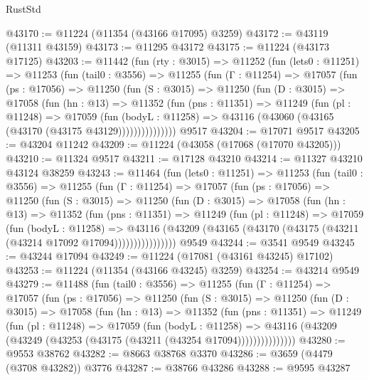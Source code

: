 \begin{lexlean}{RustStd}
\begin{coremodule}
@43170 := @11224 (@11354 (@43166 @17095) @3259)
@43172 := @43119 (@11311 @43159)
@43173 := @11295 @43172
@43175 := @11224 (@43173 @17125)
@43203 := @11442
    (fun (rty : @3015) =>
    @11252
      (fun (lets0 : @11251) =>
      @11253
        (fun (tail0 : @3556) =>
        @11255
          (fun (Γ : @11254) =>
          @17057
            (fun (ps : @17056) =>
            @11250
              (fun (S : @3015) =>
              @11250
                (fun (D : @3015) =>
                @17058
                  (fun (hn : @13) =>
                  @11352
                    (fun (pns : @11351) =>
                    @11249
                      (fun (pl : @11248) =>
                      @17059
                        (fun (bodyL : @11258) =>
                        @43116 (@43060 (@43165 (@43170 (@43175 @43129)))))))))))))))
    @9517
@43204 := @17071 @9517
@43205 := @43204 @11242
@43209 := @11224 (@43058 (@17068 (@17070 @43205)))
@43210 := @11324 @9517
@43211 := @17128 @43210
@43214 := @11327 @43210 @43124 @38259
@43243 := @11464
    (fun (lets0 : @11251) =>
    @11253
      (fun (tail0 : @3556) =>
      @11255
        (fun (Γ : @11254) =>
        @17057
          (fun (ps : @17056) =>
          @11250
            (fun (S : @3015) =>
            @11250
              (fun (D : @3015) =>
              @17058
                (fun (hn : @13) =>
                @11352
                  (fun (pns : @11351) =>
                  @11249
                    (fun (pl : @11248) =>
                    @17059
                      (fun (bodyL : @11258) =>
                      @43116
                        (@43209
                          (@43165 (@43170 (@43175 (@43211 (@43214 @17092 @17094))))))))))))))))
    @9549
@43244 := @3541 @9549
@43245 := @43244 @17094
@43249 := @11224 (@17081 (@43161 @43245) @17102)
@43253 := @11224 (@11354 (@43166 @43245) @3259)
@43254 := @43214 @9549
@43279 := @11488
    (fun (tail0 : @3556) =>
    @11255
      (fun (Γ : @11254) =>
      @17057
        (fun (ps : @17056) =>
        @11250
          (fun (S : @3015) =>
          @11250
            (fun (D : @3015) =>
            @17058
              (fun (hn : @13) =>
              @11352
                (fun (pns : @11351) =>
                @11249
                  (fun (pl : @11248) =>
                  @17059
                    (fun (bodyL : @11258) =>
                    @43116 (@43209 (@43249 (@43253 (@43175 (@43211 (@43254 @17094)))))))))))))))
@43280 := @9553 @38762
@43282 := @8663 @38768 @3370
@43286 := @3659 (@4479 (@3708 @43282)) @3776
@43287 := @38766 @43286
@43288 := @9595 @43287

\end{coremodule}
\end{lexlean}

